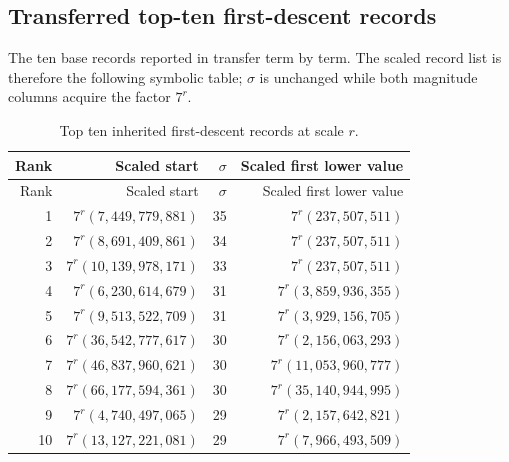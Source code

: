 \documentclass[11pt]{article}
\begin{document}
\subsection{Transferred top-ten first-descent records}
The ten base records reported in \cite{Base7Paper} transfer term by term. The scaled record list is therefore the following symbolic table; $\sigma$ is unchanged while both magnitude columns acquire the factor $7^r$.
\begin{longtable}{@{}r r r r@{}}
\caption{Top ten inherited first-descent records at scale $r$.}\label{tab:top10sigma}\\
\toprule
Rank & Scaled start & $\sigma$ & Scaled first lower value \\
\midrule
\endfirsthead
\toprule
Rank & Scaled start & $\sigma$ & Scaled first lower value \\
\midrule
\endhead
1 & $7^r(7,449,779,881)$ & 35 & $7^r(237,507,511)$ \\
2 & $7^r(8,691,409,861)$ & 34 & $7^r(237,507,511)$ \\
3 & $7^r(10,139,978,171)$ & 33 & $7^r(237,507,511)$ \\
4 & $7^r(6,230,614,679)$ & 31 & $7^r(3,859,936,355)$ \\
5 & $7^r(9,513,522,709)$ & 31 & $7^r(3,929,156,705)$ \\
6 & $7^r(36,542,777,617)$ & 30 & $7^r(2,156,063,293)$ \\
7 & $7^r(46,837,960,621)$ & 30 & $7^r(11,053,960,777)$ \\
8 & $7^r(66,177,594,361)$ & 30 & $7^r(35,140,944,995)$ \\
9 & $7^r(4,740,497,065)$ & 29 & $7^r(2,157,642,821)$ \\
10 & $7^r(13,127,221,081)$ & 29 & $7^r(7,966,493,509)$ \\
\bottomrule
\end{longtable}
\end{document}
